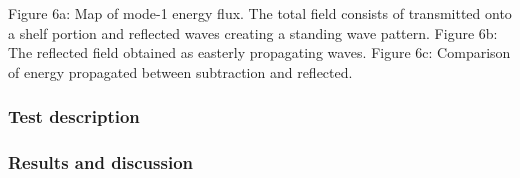 Figure 6a: Map of mode-1 energy flux. The total field consists of transmitted onto a shelf portion 
and reflected waves creating a standing wave pattern.
Figure 6b: The reflected field obtained as easterly propagating waves.
Figure 6c: Comparison of energy propagated between subtraction and reflected.

\subsubsection{Test description}
\subsubsection{Results and discussion}

%


